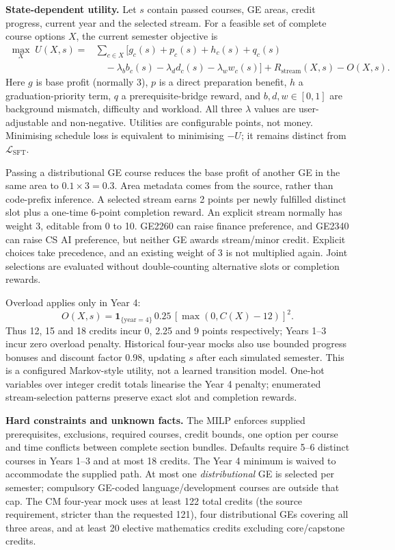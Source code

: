 \documentclass{article}
\begin{document}
\newpage
\textbf{State-dependent utility.} Let $s$ contain passed courses, GE areas, credit progress, current year and the selected stream. For a feasible set of complete course options $X$, the current semester objective is
\begin{align}
\max_X\;U(X,s)={}&\sum_{c\in X}\bigl[g_c(s)+p_c(s)+h_c(s)+q_c(s)\nonumber\\
&\quad-\lambda_b b_c(s)-\lambda_d d_c(s)-\lambda_w w_c(s)\bigr]
+R_{\mathrm{stream}}(X,s)-O(X,s). \label{eq:utility}
\end{align}
Here $g$ is base profit (normally 3), $p$ is a direct preparation benefit, $h$ a graduation-priority term, $q$ a prerequisite-bridge reward, and $b,d,w\in[0,1]$ are background mismatch, difficulty and workload. All three $\lambda$ values are user-adjustable and non-negative. Utilities are configurable points, not money. Minimising schedule loss is equivalent to minimising $-U$; it remains distinct from $\mathcal{L}_{\mathrm{SFT}}$.

Passing a distributional GE course reduces the base profit of another GE in the same area to $0.1\times3=0.3$. Area metadata comes from the source, rather than code-prefix inference. A selected stream earns 2 points per newly fulfilled distinct slot plus a one-time 6-point completion reward. An explicit stream normally has weight 3, editable from 0 to 10. GE2260 can raise finance preference, and GE2340 can raise CS AI preference, but neither GE awards stream/minor credit. Explicit choices take precedence, and an existing weight of 3 is not multiplied again. Joint selections are evaluated without double-counting alternative slots or completion rewards.

Overload applies only in Year 4:
\begin{equation}
O(X,s)=\mathbf{1}_{\{\mathrm{year}=4\}}\,0.25\,[\max(0,C(X)-12)]^2.
\end{equation}
Thus 12, 15 and 18 credits incur 0, 2.25 and 9 points respectively; Years 1--3 incur zero overload penalty. Historical four-year mocks also use bounded progress bonuses and discount factor 0.98, updating $s$ after each simulated semester. This is a configured Markov-style utility, not a learned transition model.
One-hot variables over integer credit totals linearise the Year 4 penalty; enumerated stream-selection patterns preserve exact slot and completion rewards.

\textbf{Hard constraints and unknown facts.} The MILP enforces supplied prerequisites, exclusions, required courses, credit bounds, one option per course and time conflicts between complete section bundles. Defaults require 5--6 distinct courses in Years 1--3 and at most 18 credits. The Year 4 minimum is waived to accommodate the supplied path. At most one \emph{distributional} GE is selected per semester; compulsory GE-coded language/development courses are outside that cap. The CM four-year mock uses at least 122 total credits (the source requirement, stricter than the requested 121), four distributional GEs covering all three areas, and at least 20 elective mathematics credits excluding core/capstone credits.
\end{document}
